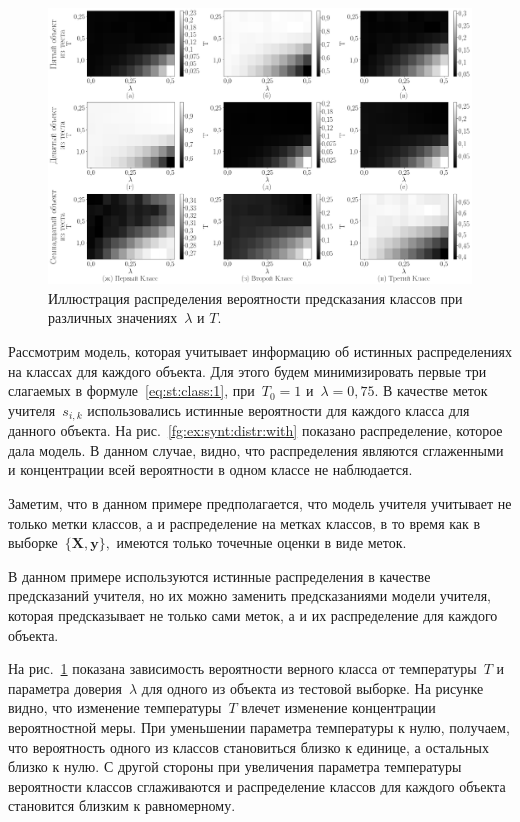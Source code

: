 \documentclass[12pt]{a&t}
\begin{document}
\begin{figure}[h!t]\center
\includegraphics[width=1\textwidth]{figures/syn_T_lambda}
\caption{Иллюстрация распределения вероятности предсказания классов при различных значениях~$\lambda$ и $T$.}
\label{fg:ex:synt:distr:lambda_T}
\end{figure}

Рассмотрим модель, которая учитывает информацию об истинных распределениях на классах для каждого объекта. Для этого будем минимизировать первые три слагаемых в формуле~\eqref{eq:st:class:1}, при~$T_0=1$ и~$\lambda=0{,}75$. В качестве меток учителя~$s_{i,k}$ использовались истинные вероятности для каждого класса для данного объекта. На рис.~\ref{fg:ex:synt:distr:with} показано распределение, которое дала модель. В данном случае, видно, что распределения являются сглаженными и концентрации всей вероятности в одном классе не наблюдается.

Заметим, что в данном примере предполагается, что модель учителя учитывает не только метки классов, а и распределение на метках классов, в то время как в выборке~$\{\mathbf{X}, \mathbf{y}\},$ имеются только точечные оценки в виде меток. 

В данном примере используются истинные распределения в качестве предсказаний учителя, но их можно заменить предсказаниями модели учителя, которая предсказывает не только сами меток, а и их распределение для каждого объекта.

На рис.~\ref{fg:ex:synt:distr:lambda_T} показана зависимость вероятности верного класса от температуры~$T$ и параметра доверия~$\lambda$ для одного из объекта из тестовой выборке. На рисунке видно, что изменение температуры~$T$ влечет изменение концентрации вероятностной меры. При уменьшении параметра температуры к нулю, получаем, что вероятность одного из классов становиться близко к единице, а остальных близко к нулю. С другой стороны при увеличения параметра температуры вероятности классов сглаживаются и распределение классов для каждого объекта становится близким к равномерному.
\end{document}
